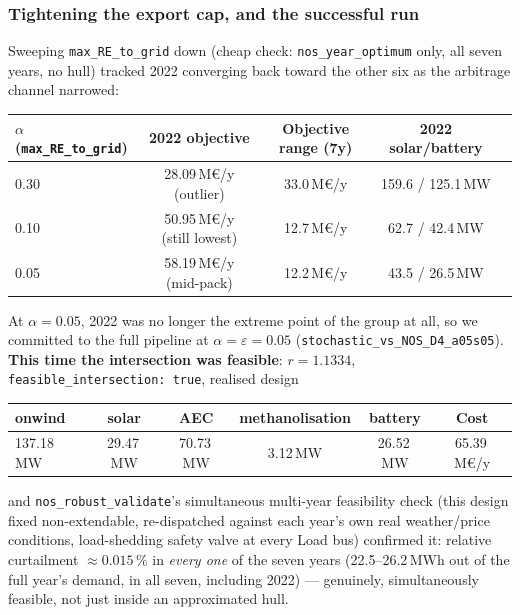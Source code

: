 \documentclass[11pt]{article}
\begin{document}
\subsubsection{Tightening the export cap, and the successful run}
Sweeping \texttt{max\_RE\_to\_grid} down (cheap check: \texttt{nos\_year\_optimum}
only, all seven years, no hull) tracked 2022 converging back toward the
other six as the arbitrage channel narrowed:
\begin{center}
\small
\begin{tabular}{@{}lcccc@{}}
\toprule
$\alpha$ (\texttt{max\_RE\_to\_grid}) & 2022 objective & Objective range (7y) & 2022 solar/battery \\
\midrule
0.30 & 28.09\,M€/y (outlier) & 33.0\,M€/y & 159.6 / 125.1\,MW \\
0.10 & 50.95\,M€/y (still lowest) & 12.7\,M€/y & 62.7 / 42.4\,MW \\
0.05 & 58.19\,M€/y (mid-pack) & 12.2\,M€/y & 43.5 / 26.5\,MW \\
\bottomrule
\end{tabular}
\end{center}
At $\alpha = 0.05$, 2022 was no longer the extreme point of the group at
all, so we committed to the full pipeline at
$\alpha = \varepsilon = 0.05$ (\texttt{stochastic\_vs\_NOS\_D4\_a05s05}).
\textbf{This time the intersection was feasible}:
$r = 1.1334$, \texttt{feasible\_intersection: true}, realised design
\begin{center}
\small
\begin{tabular}{@{}lccccc@{}}
\toprule
onwind & solar & AEC & methanolisation & battery & Cost \\
\midrule
137.18\,MW & 29.47\,MW & 70.73\,MW & 3.12\,MW & 26.52\,MW & 65.39\,M€/y \\
\bottomrule
\end{tabular}
\end{center}
and \texttt{nos\_robust\_validate}'s simultaneous multi-year feasibility
check (this design fixed non-extendable, re-dispatched against each year's
own real weather/price conditions, load-shedding safety valve at every
Load bus) confirmed it: relative curtailment $\approx \mathbf{0.015\,\%}$
in \emph{every one} of the seven years (22.5--26.2\,MWh out of the full
year's demand, in all seven, including 2022) --- genuinely,
simultaneously feasible, not just inside an approximated hull.
\end{document}
